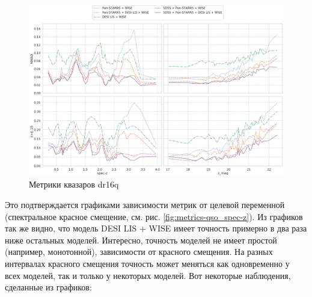 \documentclass[fleqn,usenatbib]{mnras}
\begin{document}
\begin{figure}
    \centering
    \includegraphics[width=0.9\linewidth]{images/metrics-dr16q.png}
    \caption{Метрики квазаров dr16q}
    \label{fig:metrics-cv2-gal}
\end{figure}

Это подтверждается графиками зависимости метрик от целевой переменной (спектральное красное смещение, см. рис. \ref{fig:metrics-qso_spec-z}). Из графиков так же видно, что модель DESI LIS + WISE имеет точность примерно в два раза ниже остальных моделей. Интересно, точность моделей не имеет простой (например, монотонной), зависимости от красного смещения. На разных интервалах красного смещения точность может меняться как одновременно у всех моделей, так и только у некоторых моделей. Вот некоторые наблюдения, сделанные из графиков:

\end{document}
